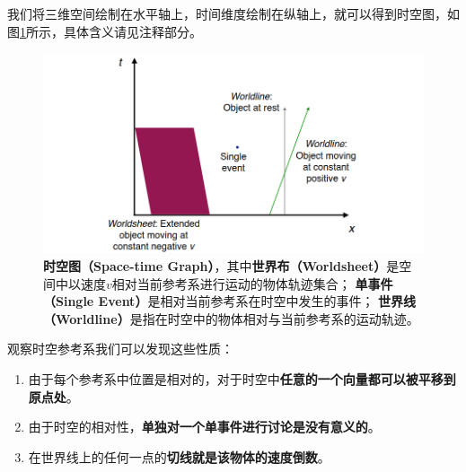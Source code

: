 \documentclass[12pt, a4paper, oneside]{ctexart}
\numberwithin{equation}{section}  %
\begin{document}
我们将三维空间绘制在水平轴上，时间维度绘制在纵轴上，就可以得到时空图，如图\ref{fig-spacetime}所示，具体含义请见注释部分。
\begin{figure}[htbp]
    \centering
    \includegraphics[scale=0.38]{spacetime.png}
    \caption{\textbf{时空图（Space-time Graph）}，其中\textbf{世界布（Worldsheet）}是空间中以速度$v$相对当前参考系进行运动的物体轨迹集合；
    \textbf{单事件（Single Event）}是相对当前参考系在时空中发生的事件；
    \textbf{世界线（Worldline）}是指在时空中的物体相对与当前参考系的运动轨迹。}
    \label{fig-spacetime}
\end{figure}

观察时空参考系我们可以发现这些性质：
\begin{enumerate}
    \item 由于每个参考系中位置是相对的，对于时空中\textbf{任意的一个向量都可以被平移到原点处}。
    \item 由于时空的相对性，\textbf{单独对一个单事件进行讨论是没有意义的}。
    \item 在世界线上的任何一点的\textbf{切线就是该物体的速度倒数}。
\end{enumerate}
\end{document}
